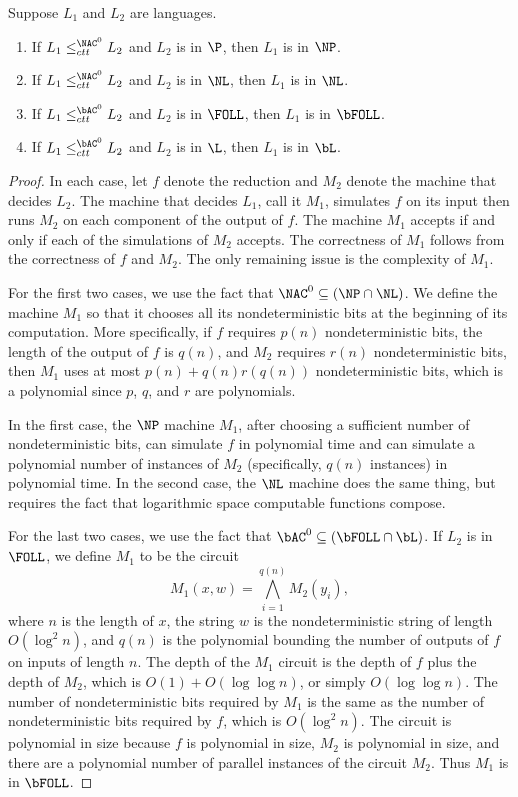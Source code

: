 \documentclass{article}
\begin{document}
\begin{lemma}\label{lem:ctt}
  Suppose $L_1$ and $L_2$ are languages.
  \begin{enumerate}
  \item If $L_1 \leq^{\NAC^0}_{ctt} L_2$ and $L_2$ is in $\P$, then $L_1$ is in $\NP$.
  \item If $L_1 \leq^{\NAC^0}_{ctt} L_2$ and $L_2$ is in $\NL$, then $L_1$ is in $\NL$.
  \item If $L_1 \leq^{\bAC^0}_{ctt} L_2$ and $L_2$ is in $\FOLL$, then $L_1$ is in $\bFOLL$.
  \item If $L_1 \leq^{\bAC^0}_{ctt} L_2$ and $L_2$ is in $\L$, then $L_1$ is in $\bL$.
  \end{enumerate}
\end{lemma}
\begin{proof}
  In each case, let $f$ denote the reduction and $M_2$ denote the machine that decides $L_2$.
  The machine that decides $L_1$, call it $M_1$, simulates $f$ on its input then runs $M_2$ on each component of the output of $f$.
  The machine $M_1$ accepts if and only if each of the simulations of $M_2$ accepts.
  The correctness of $M_1$ follows from the correctness of $f$ and $M_2$.
  The only remaining issue is the complexity of $M_1$.

  For the first two cases, we use the fact that $\NAC^0 \subseteq (\NP \cap \NL)$.
  We define the machine $M_1$ so that it chooses all its nondeterministic bits at the beginning of its computation.
  More specifically, if $f$ requires $p(n)$ nondeterministic bits, the length of the output of $f$ is $q(n)$, and $M_2$ requires $r(n)$ nondeterministic bits, then $M_1$ uses at most $p(n) + q(n) r(q(n))$ nondeterministic bits, which is a polynomial since $p$, $q$, and $r$ are polynomials.

  In the first case, the $\NP$ machine $M_1$, after choosing a sufficient number of nondeterministic bits, can simulate $f$ in polynomial time and can simulate a polynomial number of instances of $M_2$ (specifically, $q(n)$ instances) in polynomial time.
  In the second case, the $\NL$ machine does the same thing, but requires the fact that logarithmic space computable functions compose.

  For the last two cases, we use the fact that $\bAC^0 \subseteq (\bFOLL \cap \bL)$.
  If $L_2$ is in $\FOLL$, we define $M_1$ to be the circuit
  \begin{equation*}
    M_1(x, w) = \bigwedge_{i = 1}^{q(n)} M_2(y_i),
  \end{equation*}
  where $n$ is the length of $x$, the string $w$ is the nondeterministic string of length $O(\log^2 n)$, and $q(n)$ is the polynomial bounding the number of outputs of $f$ on inputs of length $n$.
  The depth of the $M_1$ circuit is the depth of $f$ plus the depth of $M_2$, which is $O(1) + O(\log \log n)$, or simply $O(\log \log n)$.
  The number of nondeterministic bits required by $M_1$ is the same as the number of nondeterministic bits required by $f$, which is $O(\log^2 n)$.
  The circuit is polynomial in size because $f$ is polynomial in size, $M_2$ is polynomial in size, and there are a polynomial number of parallel instances of the circuit $M_2$.
  Thus $M_1$ is in $\bFOLL$.


\end{proof}
\end{document}
